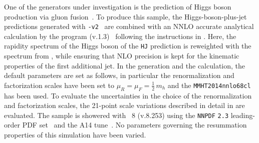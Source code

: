 \subsubsection{\Powheg \NNLOPS}
\label{sec:hjetscomp:tools:nnlops:powheg}

One of the generators under investigation is the \NNLOPS prediction 
of Higgs boson production via gluon fusion~\cite{Hamilton:2013fea}.
To produce this sample, the Higgs-boson-plus-jet \MINLO~\cite{Hamilton:2012np} 
predictions generated with \PowhegBox{}\texttt{-v2}~\cite{Campbell:2012am} 
are combined with an NNLO accurate analytical calculation by the 
program \HNNLO (v.1.3)~\cite{Catani:2007vq,Grazzini:2008tf,Grazzini:2013mca} 
following the instructions in \cite{Hamilton:2013fea}. Here, the rapidity 
spectrum of the Higgs boson of the \Powheg \texttt{HJ} \MINLO prediction 
is reweighted with the spectrum from \HNNLO, while ensuring that NLO 
precision is kept for the kinematic properties of the first additional jet. 
In the generation and the \HNNLO calculation, the default parameters are 
set as follows, in particular the renormalization and factorization scales 
have been set to $\mu_R = \mu_F = \tfrac{1}{2}\,m_h$ and the 
\texttt{MMHT2014nnlo68cl} \cite{Harland-Lang:2014zoa} has been used. 
To evaluate the uncertainties in the choice of the renormalization and 
factorization scales, the 21-point scale variations described in detail 
in \cite{Hamilton:2013fea} are evaluated.
The \NNLOPS sample is showered with \Pythia~8 (v.8.253) \cite{Sjostrand:2014zea} 
using the \texttt{NNPDF} \texttt{2.3} leading-order PDF set~\cite{Ball:2012cx} 
and the A14 tune~\cite{ATL-PHYS-PUB-2014-021}. No parameters governing the 
resummation properties of this simulation have been varied.

